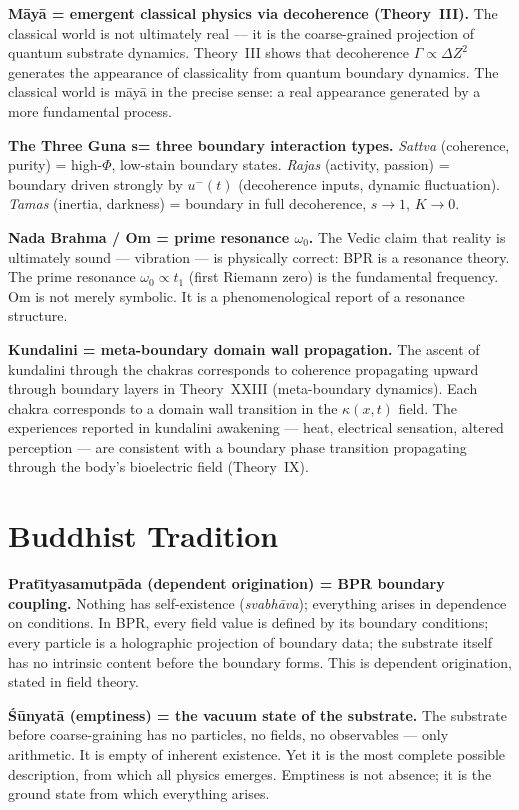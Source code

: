 \documentclass[12pt,oneside]{book}
\theoremstyle{definition}
\begin{document}
\noindent\textbf{M\={a}y\={a} = emergent classical physics via decoherence (Theory~III).}
The classical world is not ultimately real --- it is the coarse-grained projection
of quantum substrate dynamics. Theory~III shows that decoherence $\Gamma \propto
\Delta Z^2$ generates the appearance of classicality from quantum boundary dynamics.
The classical world is m\={a}y\={a} in the precise sense: a real appearance generated
by a more fundamental process.

\noindent\textbf{The Three Guna s= three boundary interaction types.}
\textit{Sattva} (coherence, purity) = high-$\Phi$, low-stain boundary states.
\textit{Rajas} (activity, passion) = boundary driven strongly by $u^-(t)$ (decoherence
inputs, dynamic fluctuation). \textit{Tamas} (inertia, darkness) = boundary in
full decoherence, $s \to 1$, $K \to 0$.

\noindent\textbf{Nada Brahma / Om = prime resonance $\omega_0$.}
The Vedic claim that reality is ultimately sound --- vibration --- is physically
correct: BPR is a resonance theory. The prime resonance $\omega_0 \propto t_1$
(first Riemann zero) is the fundamental frequency. Om is not merely symbolic.
It is a phenomenological report of a resonance structure.

\noindent\textbf{Kundalini = meta-boundary domain wall propagation.}
The ascent of kundalini through the chakras corresponds to coherence propagating
upward through boundary layers in Theory~XXIII (meta-boundary dynamics). Each
chakra corresponds to a domain wall transition in the $\kappa(x,t)$ field.
The experiences reported in kundalini awakening --- heat, electrical sensation,
altered perception --- are consistent with a boundary phase transition propagating
through the body's bioelectric field (Theory~IX).

\section{Buddhist Tradition}

\noindent\textbf{Prat\={\i}tyasamutp\={a}da (dependent origination) = BPR boundary coupling.}
Nothing has self-existence (\textit{svabh\={a}va}); everything arises in dependence
on conditions. In BPR, every field value is defined by its boundary conditions;
every particle is a holographic projection of boundary data; the substrate itself
has no intrinsic content before the boundary forms. This is dependent origination,
stated in field theory.

\noindent\textbf{\'{S}\={u}nyat\={a} (emptiness) = the vacuum state of the substrate.}
The substrate before coarse-graining has no particles, no fields, no observables ---
only arithmetic. It is empty of inherent existence. Yet it is the most complete
possible description, from which all physics emerges. Emptiness is not absence;
it is the ground state from which everything arises.
\end{document}

